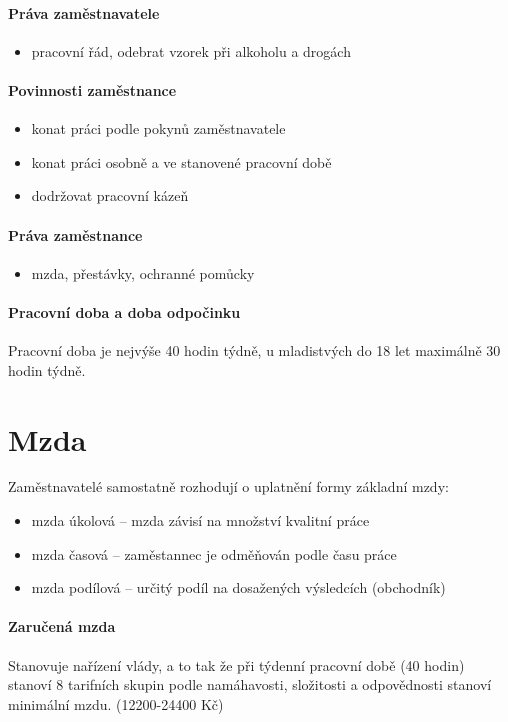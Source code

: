 \documentclass[11pt,a4paper,twoside]{book}
\begin{document}
	\paragraph*{Práva zaměstnavatele}
	\begin{itemize}
		\item pracovní řád, odebrat vzorek při alkoholu a drogách	
	\end{itemize}

	\paragraph*{Povinnosti zaměstnance}
	\begin{itemize}
		\item konat práci podle pokynů zaměstnavatele
		\item konat práci osobně a ve stanovené pracovní době
		\item dodržovat pracovní kázeň
	\end{itemize}

	\paragraph*{Práva zaměstnance}
	\begin{itemize}
		\item mzda, přestávky, ochranné pomůcky	
	\end{itemize}

	\paragraph*{Pracovní doba a doba odpočinku}
	Pracovní doba je nejvýše 40 hodin týdně, u mladistvých do 18 let maximálně 30 hodin týdně.

	\section*{Mzda}

	Zaměstnavatelé samostatně rozhodují o uplatnění formy základní mzdy:
	\begin{itemize}
		\item mzda úkolová -- mzda závisí na množství kvalitní práce
		\item mzda časová -- zaměstannec je odměňován podle času práce
		\item mzda podílová -- určitý podíl na dosažených výsledcích (obchodník)
	\end{itemize}

	\paragraph*{Zaručená mzda}
	Stanovuje nařízení vlády, a to tak že při týdenní pracovní době (40 hodin) stanoví 8 tarifních skupin podle namáhavosti, složitosti a odpovědnosti stanoví minimální mzdu. (12200-24400 Kč)
\end{document}
